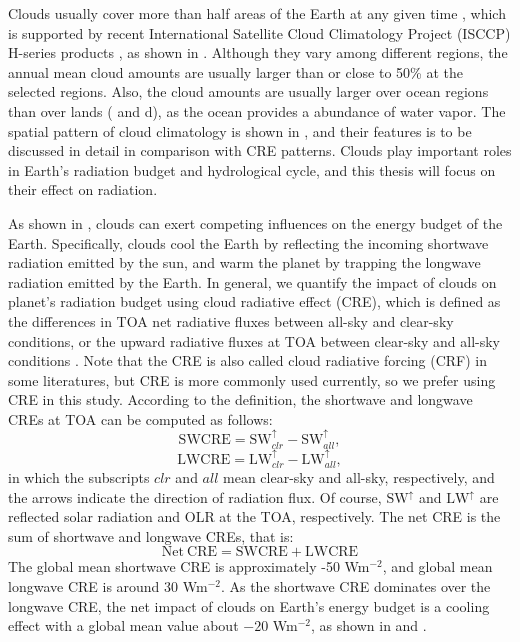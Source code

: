 Clouds usually cover more than half areas of the Earth at any given time \citep{Houze2014,Ramanathan1989}, which is supported by recent International Satellite Cloud Climatology Project (ISCCP) H-series products \citep{Young2018}, as shown in . Although they vary among different regions, the annual mean cloud amounts are usually larger than or close to 50\% at the selected regions. Also, the cloud amounts are usually larger over ocean regions than over lands ( and d), as the ocean provides a abundance of water vapor. The spatial pattern of cloud climatology is shown in , and their features is to be discussed in detail in comparison with CRE patterns. Clouds play important roles in Earth's radiation budget and hydrological cycle, and this thesis will focus on their effect on radiation.

As shown in , clouds can exert competing influences on the energy budget of the Earth. Specifically, clouds cool the Earth by reflecting the incoming shortwave radiation emitted by the sun, and warm the planet by trapping the longwave radiation emitted by the Earth. In general, we quantify the impact of clouds on planet's radiation budget using cloud radiative effect (CRE), which is defined as the differences in TOA net radiative fluxes between all-sky and clear-sky conditions, or the upward radiative fluxes at TOA between clear-sky and all-sky conditions \citep[e.g.,][]{Ramanathan1989,Soden2004,Soden2008,Li2017}. Note that the CRE is also called cloud radiative forcing (CRF) in some literatures, but CRE is more commonly used currently, so we prefer using CRE in this study. According to the definition, the shortwave and longwave CREs at TOA can be computed as follows:
\begin{equation}
    \mathrm{SWCRE} = \mathrm{SW}_{clr}^{\uparrow} - \mathrm{SW}_{all}^{\uparrow},
    \label{eq:swcre}
\end{equation}
\begin{equation}
    \mathrm{LWCRE} = \mathrm{LW}_{clr}^{\uparrow} - \mathrm{LW}_{all}^{\uparrow},
    \label{eq:lwcre}
\end{equation}
in which the subscripts $clr$ and $all$ mean clear-sky and all-sky, respectively, and the arrows indicate the direction of radiation flux. Of course, $\mathrm{SW}^{\uparrow}$ and $\mathrm{LW}^{\uparrow}$ are reflected solar radiation and OLR at the TOA, respectively. The net CRE is the sum of shortwave and longwave CREs, that is:
\begin{equation}
    \mathrm{Net~CRE} = \mathrm{SWCRE} + \mathrm{LWCRE}
    \label{eq:net_cre}
\end{equation}
The global mean shortwave CRE is approximately -50 Wm$^{-2}$, and global mean longwave CRE is around 30 Wm$^{-2}$. As the shortwave CRE dominates over the longwave CRE, the net impact of clouds on Earth's energy budget is a cooling effect with a global mean value about $-20$ Wm$^{-2}$, as shown in  and .

